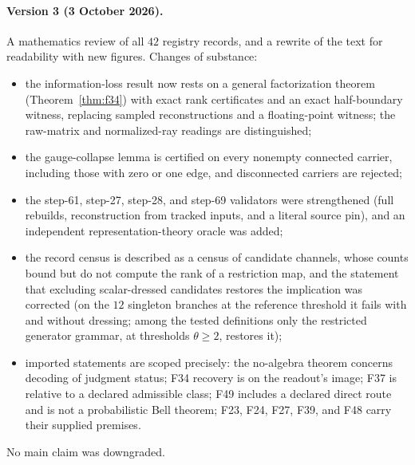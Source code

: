 \documentclass[11pt]{article}
\theoremstyle{definition}
\providecommand{\tightlist}{\setlength{\itemsep}{0pt}\setlength{\parskip}{0pt}}
\begin{document}
\paragraph{Version 3 (3 October 2026).} A mathematics review of all \(42\) registry records, and a rewrite of the text
for readability with new figures. Changes of substance:
\begin{itemize}\tightlist
\item the information-loss result now rests on a general factorization theorem (Theorem~\ref{thm:f34}) with exact
  rank certificates and an exact half-boundary witness, replacing sampled reconstructions and a floating-point witness;
  the raw-matrix and normalized-ray readings are distinguished;
\item the gauge-collapse lemma is certified on every nonempty connected carrier, including those with zero or one
  edge, and disconnected carriers are rejected;
\item the step-61, step-27, step-28, and step-69 validators were strengthened (full rebuilds, reconstruction from
  tracked inputs, and a literal source pin), and an independent representation-theory oracle was added;
\item the record census is described as a census of candidate channels, whose counts bound but do not compute the
  rank of a restriction map, and the statement that excluding scalar-dressed candidates restores the implication was
  corrected (on the \(12\) singleton branches at the reference threshold it fails with and without dressing; among
the tested definitions only the restricted generator grammar, at thresholds \(\theta\ge2\), restores it);
\item imported statements are scoped precisely: the no-algebra theorem concerns decoding of judgment status; F34
  recovery is on the readout's image; F37 is relative to a declared admissible class; F49 includes a declared direct
  route and is not a probabilistic Bell theorem; F23, F24, F27, F39, and F48 carry their supplied premises.
\end{itemize}
No main claim was downgraded.
 
\end{document}
